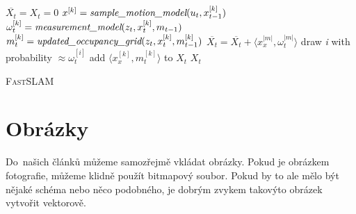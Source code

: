 \documentclass[a4paper, 11pt]{article}
\begin{document}
  \IncMargin{2em}
    \begin{algorithm}
      \label{algoritmus:1}
      \DontPrintSemicolon
      \SetNlSkip{0.6em}
      \SetNlSty{}{}{:}
      \SetInd{1em}{1em}
      
      \Indm
      \Indmm
      
      \Indp
      \Indpp
      \BlankLine
      $ \overline{X_t} = X_t = 0$\;
      {
        $x^{[k]}        = \emph{sample\_motion\_model}(u_t,x^{[k]}_{t-1})$\;
        $\omega^{[k]}_t = \emph{measurement\_model}(z_t,x^{[k]}_t,m_{t-1})$\;
        $m^{[k]}_t      = \emph{updated\_occupancy\_grid}(z_t,x^{[k]}_t,m^{[k]}_{t-1})$\;
        $\overline{X_t} = \overline{X_t}+\langle x^{|m|}_x,\omega^{|m|}_t\rangle$\;
      }
      {
        draw \emph{i} with probability $\approx \omega^{[i]}_t$\;
        add $\langle x^{[k]}_x,m^{[k]}_t \rangle$ to $X_t$\;
      }
      \KwRet${X_t}$
      \caption{\textsc{FastSLAM}}
    \end{algorithm}
  \DecMargin{1.4em}

  \section{Obrázky}
  Do~našich článků můžeme samozřejmě vkládat obrázky. Pokud je obrázkem fotografie, můžeme
  klidně použít bitmapový soubor. Pokud by to ale mělo být nějaké schéma nebo něco podobného,
  je dobrým zvykem takovýto obrázek vytvořit vektorově.
\end{document}
